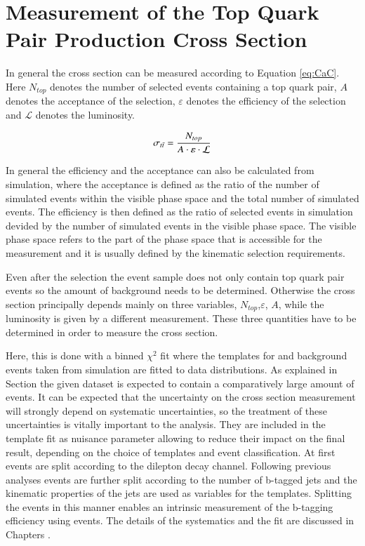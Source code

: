 \chapter{Measurement of the Top Quark Pair Production Cross Section}

In general the cross section can be measured according to Equation \ref{eq:CaC}. Here $N_{top}$ denotes the number of selected events containing a top quark pair, $A$ denotes the acceptance of the selection,
$\varepsilon$ denotes the efficiency of the selection and $\mathcal{L}$ denotes the luminosity.


\begin{equation}
\sigma_{t\bar{t}} = \frac{N_{top}}{A \cdot \varepsilon \cdot \mathcal{L}}
\label{eq:CaC}
\end{equation} 

In general the efficiency and the acceptance can also be calculated from simulation, where
the acceptance is defined as the ratio of the number of simulated \ttbar events within the visible phase space and the total number of simulated \ttbar events.
The efficiency is then defined as the ratio of selected \ttbar events in simulation devided by the number of simulated \ttbar events in the visible phase space.
The visible phase space refers to the part of the phase space that is accessible for the measurement and it is usually defined by the kinematic selection requirements.


Even after the selection the event sample does not only contain top quark pair events so the amount of background needs to be determined.
Otherwise the cross section principally depends mainly on three variables, $N_{top}$,$\varepsilon$, $A$, while the luminosity is given by a different measurement.
These three quantities have to be determined in order to measure the cross section. 

Here, this is done with a binned $\chi^2$ fit where the templates for \ttbar and background events taken from simulation are fitted to data distributions.
As explained in Section  the given dataset is expected to contain a comparatively large amount of \ttbar events. 
It can be expected that the uncertainty on the \ttbar cross section measurement will strongly depend on systematic uncertainties, so the treatment of these uncertainties
is vitally important to the analysis. They are included in the template fit as nuisance parameter allowing to reduce their impact on the final result, depending on the choice 
of templates and event classification. At first events are split according to the dilepton decay channel.
Following previous analyses  events are further split according to the number of b-tagged jets and the kinematic properties of the jets are used as variables for the 
templates. Splitting the events in this manner enables an intrinsic measurement of the b-tagging efficiency using \ttbar events. The details of the systematics and the fit are discussed in Chapters .

